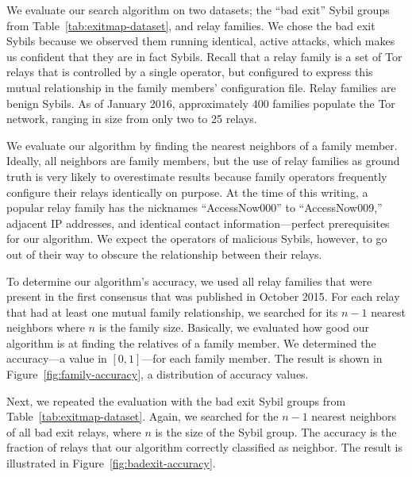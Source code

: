 We evaluate our search algorithm on two datasets; the ``bad exit'' Sybil groups
from Table~\ref{tab:exitmap-dataset}, and relay families.  We chose the bad exit
Sybils because we observed them running identical, active attacks, which makes
us confident that they are in fact Sybils.  Recall that a relay family is a set
of Tor relays that is controlled by a single operator, but configured to express
this mutual relationship in the family members' configuration file.  Relay
families are benign Sybils.  As of January 2016, approximately 400 families
populate the Tor network, ranging in size from only two to 25 relays.

We evaluate our algorithm by finding the nearest neighbors of a family member.
Ideally, all neighbors are family members, but the use of relay families as
ground truth is very likely to overestimate results because family operators
frequently configure their relays identically on purpose.  At the time of this
writing, a popular relay family has the nicknames ``AccessNow000'' to
``AccessNow009,'' adjacent IP addresses, and identical contact
information---perfect prerequisites for our algorithm.  We expect the operators
of malicious Sybils, however, to go out of their way to obscure the relationship
between their relays.

To determine our algorithm's accuracy, we used all relay families that were
present in the first consensus that was published in October 2015.  For each
relay that had at least one mutual family relationship, we searched for its $n -
1$ nearest neighbors where $n$ is the family size.  Basically, we evaluated how
good our algorithm is at finding the relatives of a family member.  We
determined the accuracy---a value in $[0,1]$---for each family member.  The
result is shown in Figure~\ref{fig:family-accuracy}, a distribution of accuracy
values.

Next, we repeated the evaluation with the bad exit Sybil groups from
Table~\ref{tab:exitmap-dataset}.  Again, we searched for the $n - 1$ nearest
neighbors of all bad exit relays, where $n$ is the size of the Sybil group.  The
accuracy is the fraction of relays that our algorithm correctly classified as
neighbor.  The result is illustrated in Figure~\ref{fig:badexit-accuracy}.

